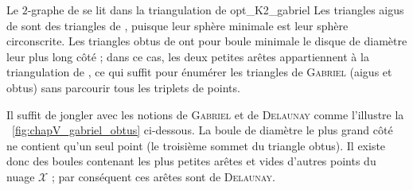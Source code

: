 \begin{Fait}{Le $2$-graphe de  se lit dans la triangulation de  \cite{BibiAppliedNetworkScience}}{opt_K2_gabriel}
Les triangles aigus de  sont des triangles de , puisque leur sphère minimale est leur sphère circonscrite. Les triangles obtus de  ont pour boule minimale le disque de diamètre leur plus long côté ; dans ce cas, les deux petites arêtes appartiennent à la triangulation de , ce qui suffit pour énumérer les triangles de \textsc{Gabriel} (aigus et obtus) sans parcourir tous les triplets de points.
\end{Fait}
\begin{Preuve}
Il suffit de jongler avec les notions de \textsc{Gabriel} et de \textsc{Delaunay} comme l'illustre la \Fig~\ref{fig:chapV_gabriel_obtus} ci-dessous. 
La boule de diamètre le plus grand côté ne contient qu'un seul point (le troisième sommet du triangle obtus). Il existe donc des boules contenant les plus petites arêtes et vides d'autres points du nuage $\mathcal X$ ; par conséquent ces arêtes sont de \textsc{Delaunay}.



\end{Preuve}

